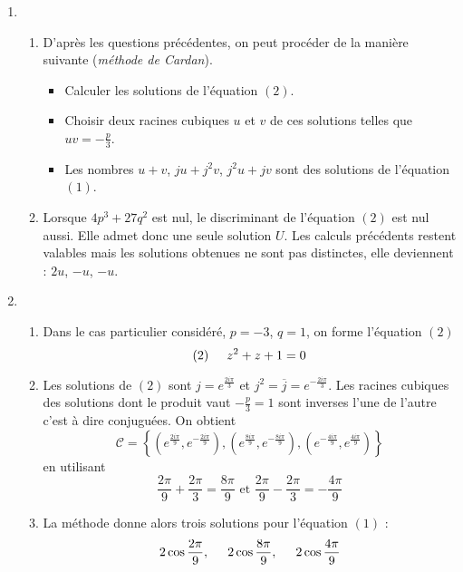 \begin{enumerate}
 \item
\begin{enumerate}
 \item D'après les questions précédentes, on peut procéder de la manière suivante (\emph{méthode de Cardan}).
\begin{itemize}
 \item Calculer les solutions de l'équation $(2)$.
 \item Choisir deux racines cubiques $u$ et $v$ de ces solutions telles que $uv=-\frac{p}{3}$.
 \item Les nombres $u+v$, $ju + j^2v$, $j^2u +jv$ sont des solutions de l'équation $(1)$.
\end{itemize}

 \item Lorsque $4p^3+27q^2$ est nul, le discriminant de l'équation $(2)$ est nul aussi. Elle admet donc une seule solution $U$. 
Les calculs précédents restent valables mais les solutions obtenues ne sont pas distinctes, elle deviennent : $2u$, $-u$, $-u$.
\end{enumerate}

 \item
\begin{enumerate}
 \item Dans le cas particulier considéré, $p=-3$, $q=1$, on forme l'équation $(2)$
\begin{displaymath}
 (2)\hspace{0.5cm} z^2 + z + 1 = 0
\end{displaymath}

 \item Les solutions de $(2)$ sont $j=e^{\frac{2i\pi}{3}}$ et $j^2=\overline{j}=e^{-\frac{2i\pi}{3}}$. Les racines cubiques des solutions dont le produit vaut $-\frac{p}{3}=1$ sont inverses l'une de l'autre c'est à dire conjuguées. On obtient
\begin{displaymath}
\mathcal{C} = \left\lbrace 
 \left( e^{\frac{2i\pi}{9}},e^{-\frac{2i\pi}{9}}\right), 
 \left( e^{\frac{8i\pi}{9}},e^{-\frac{8i\pi}{9}}\right),
 \left( e^{-\frac{4i\pi}{9}},e^{\frac{4i\pi}{9}}\right)
\right\rbrace 
\end{displaymath}
en utilisant
\begin{displaymath}
 \frac{2\pi}{9} + \frac{2\pi}{3} = \frac{8\pi}{9} \text{ et }
 \frac{2\pi}{9} - \frac{2\pi}{3} = -\frac{4\pi}{9}
\end{displaymath}

 \item La méthode donne alors trois solutions pour l'équation $(1)$ :
\begin{displaymath}
 2\cos \frac{2\pi}{9}, \hspace{0.5cm} 2\cos \frac{8\pi}{9}, \hspace{0.5cm} 2\cos \frac{4\pi}{9}
\end{displaymath}

\end{enumerate}

\end{enumerate}

